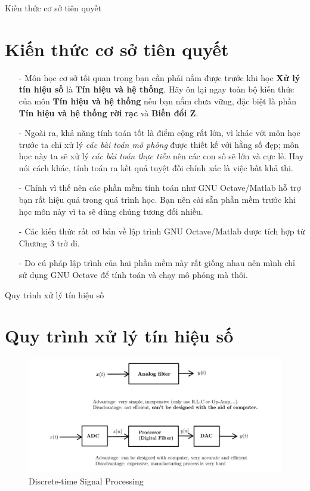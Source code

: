\documentclass[8pt]{beamer}
\begin{document}
\begin{frame}{Kiến thức cơ sở tiên quyết}
\section{Kiến thức cơ sở tiên quyết}
\begin{itemize}

	\item[-] Môn học cơ sở tối quan trọng bạn cần phải nắm được trước khi học \textbf{Xử lý tín hiệu số} là \alert{\textbf{Tín hiệu và hệ thống}}. Hãy ôn lại ngay toàn bộ kiến thức của môn \alert{\textbf{Tín hiệu và hệ thống}} nếu bạn nắm chưa vững, đặc biệt là phần \textbf{Tín hiệu và hệ thống rời rạc} và \textbf{Biến đổi Z}.
\item[-] Ngoài ra, khả năng tính toán tốt là điểm cộng rất lớn, vì khác với môn học trước ta chỉ xử lý \textit{các bài toán mô phỏng} được thiết kế với hằng số đẹp; môn học này ta sẽ xử lý \textit{các bài toán thực tiễn} nên các con số sẽ lớn và cực lẻ. Hay nói cách khác, tính toán ra kết quả tuyệt đối chính xác là việc bất khả thi.
\item[-] Chính vì thế nên  các phần mềm tính toán như GNU Octave/Matlab hỗ trợ bạn rất hiệu quả trong quá trình học. Bạn nên cài sẵn phần mềm trước khi học môn này vì ta sẽ dùng chúng tương đối nhiều.
\item[-] Các kiến thức rất cơ bản về lập trình GNU Octave/Matlab được tích hợp từ \alert{Chương 3} trở đi.
\item[-] Do cú pháp lập trình của hai phần mềm này rất giống nhau nên mình chỉ sử dụng GNU Octave để tính toán và chạy mô phỏng mà thôi.
\end{itemize}
\end{frame}
\begin{frame}{Quy trình xử lý tín hiệu số}
\section{Quy trình xử lý tín hiệu số}
\begin{figure}[h]
			\includegraphics[width=1.1\textwidth]{1.jpg}
			\caption{Discrete-time Signal Processing}			\label{fig:re1}
		\end{figure}

\end{frame}
\end{document}
